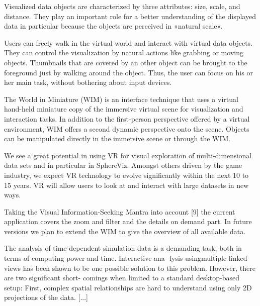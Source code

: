 Visualized data objects are characterized by three attributes: size, scale, and distance. They play an important role for a better understanding of the displayed data in particular because the objects are perceived in «natural scale».
\cite{Soldati2007}

Users can freely walk in the virtual world and interact with virtual data objects. They can control the visualization by natural actions like grabbing or moving objects. Thumbnails that are covered by an other object can be brought
to the foreground just by walking around the object. Thus, the user can focus on his or her main task, without bothering about input devices.
\cite{Soldati2007}

The World in Miniature (WIM) is an interface technique that uses a virtual hand-held miniature copy of the immersive virtual scene for visualization and interaction tasks. In addition to the first-person perspective offered by a virtual environment, WIM offers a second dynamic perspective onto the scene. Objects can be manipulated directly in the immersive scene or through the WIM.
\cite{Soldati2007}

We see a great potential in using VR for visual exploration of multi-dimensional data sets and in particular in SphereViz. Amongst others driven by the game industry, we expect VR technology to evolve significantly within the next 10 to 15 years. VR will allow users to look at and interact with large datasets in new ways.
\cite{Soldati2007}

Taking the Visual Information-Seeking Mantra into account [9] the current application covers the zoom and filter and the details on demand part. In future versions we plan to extend the WIM to give the overview of all available data.
\cite{Soldati2007}

The analysis of time-dependent simulation data is a demanding task, both in terms of computing power and time. Interactive ana- lysis usingmultiple linked views has been shown to be one possible solution to this problem. However, there are two significant short- comings when limited to a standard desktop-based setup: First, complex spatial relationships are hard to understand using only 2D projections of the data. [...]
\cite{Hentschel2009}



